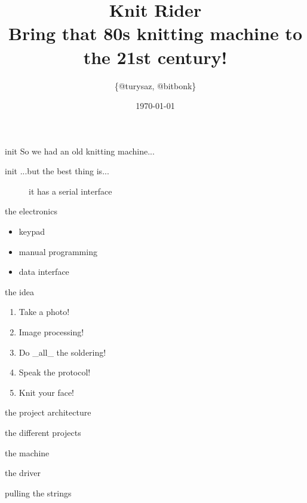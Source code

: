 \documentclass{beamer}
\author{\{@turysaz, @bitbonk\}}
\title{\Huge{Knit Rider}\\
    \large{Bring that 80s knitting machine to the 21st century!}
}
\date{\today{}}
\begin{document}
\maketitle

\begin{frame}{init}
      So we had an old knitting machine...
\end{frame}


\begin{frame}{init}
    ...but the best thing is...\pause
    \begin{figure}
        \caption{it has a serial interface}
    \end{figure}
\end{frame}

\begin{frame}{the electronics}
    \begin{itemize}
        \item keypad
        \item manual programming
        \item data interface
    \end{itemize}
\end{frame}

\begin{frame}{the idea}
    \begin{enumerate}[<+->]
        \item Take a photo!
        \item Image processing!
        \item Do \_all\_ the soldering!
        \item Speak the protocol!
        \item Knit your face!
    \end{enumerate}
\end{frame}

\begin{frame}{the project architecture}
    \begin{figure}
    \end{figure}
\end{frame}

\begin{frame}{the different projects}
    \begin{description}[<+->]
        \item [knitt] the machine
        \item [michael] the driver
        \item [devon] pulling the strings
    \end{description}
\end{frame}
\end{document}
